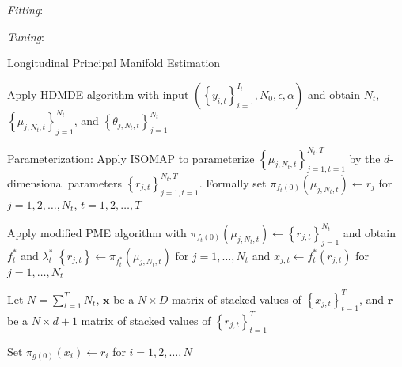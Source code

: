 \documentclass[11pt,reqno]{article}
\theoremstyle{definition}
\begin{document}
\textit{Fitting}:

\textit{Tuning}:

\LinesNumbered


\LinesNumbered

\begin{algorithm}
\caption{Longitudinal Principal Manifold Estimation}\label{alg:lpme}
 {
  Apply HDMDE algorithm with input $\left(\left\{y_{i, t}\right\}_{i = 1}^{I_t}, N_0, \epsilon, \alpha\right)$ and obtain $N_t$, $\left\{\mu_{j, N_t, t}\right\}_{j = 1}^{N_t}$, and $\left\{\theta_{j, N_t, t}\right\}_{j = 1}^{N_t}$\;
}

Parameterization: Apply ISOMAP to parameterize $\left\{\mu_{j, N_t, t}\right\}_{j = 1, t = 1}^{N_t, T}$ by the $d$-dimensional parameters $\left\{r_{j, t}\right\}_{j = 1, t = 1}^{N_t, T}$. Formally set $\pi_{f_t(0)}(\mu_{j, N_t, t}) \gets r_j$ for $j = 1, 2, \dots, N_t$, $t = 1, 2, \dots, T$\;

 {
  Apply modified PME algorithm with $\pi_{f_t(0)}(\mu_{j, N_t, t}) \gets \left\{r_{j, t}\right\}_{j = 1}^{N_t}$ and obtain $f_t^*$ and $\lambda_t^*$\;
  $\left\{r_{j, t}\right\} \gets \pi_{f_t^*}(\mu_{j, N_t, t})$ for $j = 1, \dots, N_t$ and $x_{j, t} \gets f_t^*(r_{j, t})$ for $j = 1, \dots, N_t$\;
}

Let $N = \sum_{t=1}^{T}N_t$, $\mathbf{x}$ be a $N \times D$ matrix of stacked values of $\left\{x_{j, t}\right\}_{t = 1}^T$, and $\mathbf{r}$ be a $N \times d + 1$ matrix of stacked values of $\left\{r_{j, t}\right\}_{t = 1}^T$ \;

Set $\pi_{g(0)}(x_i) \gets r_i$ for $i = 1, 2, \dots, N$\;


\end{algorithm}
\end{document}
